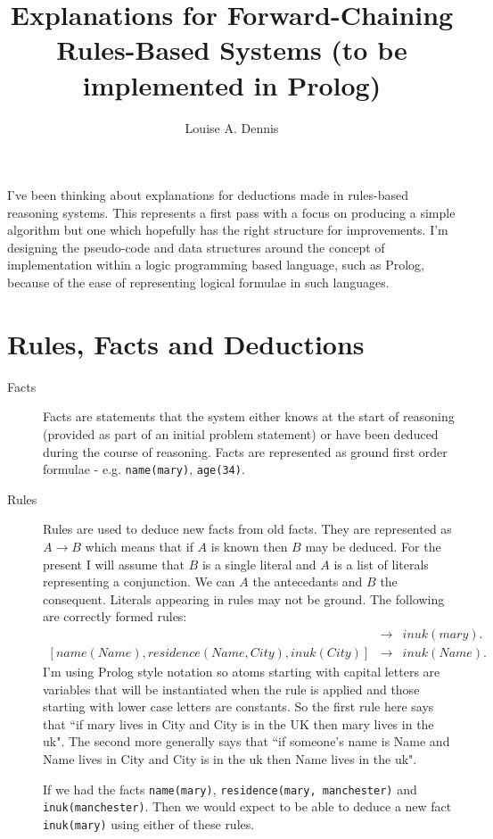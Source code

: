 \documentclass{blue-book}
\title{Explanations for Forward-Chaining Rules-Based Systems (to be implemented in Prolog)}
\author{Louise A. Dennis}
\begin{document}
\maketitle
I've been thinking about explanations for deductions made in rules-based reasoning systems.  This represents a first pass with a focus on producing a simple algorithm but one which hopefully has the right structure for improvements.  I'm designing the pseudo-code and data structures around the concept of implementation within a logic programming based language, such as Prolog, because of the ease of representing logical formulae in such languages.

\section{Rules, Facts and Deductions}

\begin{description}
\item[Facts] Facts are statements that the system either knows at the start of reasoning (provided as part of an initial problem statement) or have been deduced during the course of reasoning.  Facts are represented as ground first order formulae - e.g. \texttt{name(mary)}, \texttt{age(34)}.
\item[Rules] Rules are used to deduce new facts from old facts.  They are represented as $A \rightarrow B$ which means that if $A$ is known then $B$ may be deduced.  For the present I will assume that $B$ is a single literal and $A$ is a list of literals representing a conjunction.  We can $A$ the antecedants and $B$ the consequent.  Literals appearing in rules may not be ground.  The following are correctly formed rules:
\begin{eqnarray}
[residence(mary, City), inuk(City)] & \rightarrow & inuk(mary). \\ 
{}[name(Name), residence(Name, City), inuk(City)]  & \rightarrow & inuk(Name).
\end{eqnarray}
I'm using Prolog style notation so atoms starting with capital letters are variables that will be instantiated when the rule is applied and those starting with lower case letters are constants.  So the first rule here says that ``if mary lives in City and City is in the UK then mary lives in the uk".  The second more generally says that ``if someone's name is Name and Name lives in City and City is in the uk then Name lives in the uk".

If we had the facts \texttt{name(mary)}, \texttt{residence(mary, manchester)} and \texttt{inuk(manchester)}.  Then we would expect to be able to deduce a new fact \texttt{inuk(mary)} using either of these rules.
\end{description}
\end{document}
